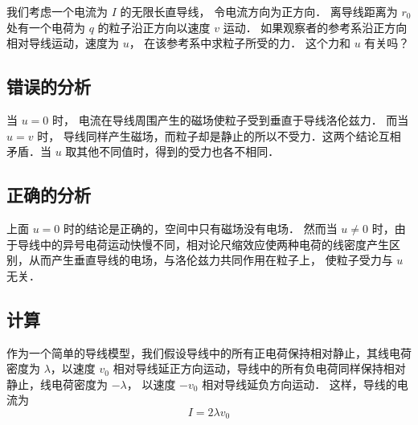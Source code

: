 

我们考虑一个电流为 $I$ 的无限长直导线， 令电流方向为正方向． 离导线距离为 $r_0$ 处有一个电荷为 $q$ 的粒子沿正方向以速度 $v$ 运动． 如果观察者的参考系沿正方向相对导线运动，速度为 $u$， 在该参考系中求粒子所受的力． 这个力和 $u$ 有关吗？


\subsection{错误的分析}
当 $u = 0$ 时， 电流在导线周围产生的磁场使粒子受到垂直于导线洛伦兹力． 而当 $u = v$ 时， 导线同样产生磁场，而粒子却是静止的所以不受力．这两个结论互相矛盾．当 $u$ 取其他不同值时，得到的受力也各不相同．

\subsection{正确的分析}
上面 $u = 0$ 时的结论是正确的，空间中只有磁场没有电场． 然而当 $u \ne 0$ 时，由于导线中的异号电荷运动快慢不同，相对论尺缩效应使两种电荷的线密度产生区别，从而产生垂直导线的电场，与洛伦兹力共同作用在粒子上， 使粒子受力与 $u$ 无关．

\subsection{计算}
作为一个简单的导线模型，我们假设导线中的所有正电荷保持相对静止，其线电荷密度为 $\lambda$，以速度 $v_0$ 相对导线延正方向运动，导线中的所有负电荷同样保持相对静止，线电荷密度为 $-\lambda$， 以速度 $-v_0$ 相对导线延负方向运动． 这样，导线的电流为
\begin{equation}
I = 2\lambda v_0
\end{equation}

